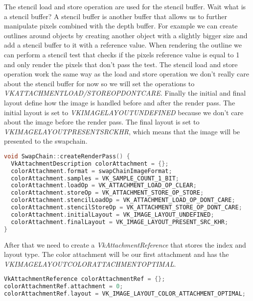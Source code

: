 \documentclass[12pt]{report} \usepackage{preamble}
\begin{document}
The stencil load and store operation are used for the stencil buffer. Wait what is a stencil buffer? A stencil buffer
is another buffer that allows us to further manipulate pixels combined with the depth buffer. For example we can
create outlines around objects by creating another object with a slightly bigger size and add a stencil buffer to it with a
reference value. When rendering the outline we can perform a stencil test that checks if the pixels reference value is
equal to 1 and only render the pixels that don't pass the test. The stencil load and store operation work the same way
as the load and store operation we don't really care about the stencil buffer for now so we will set the operations to
\textit{VK\textunderscore ATTACHMENT\textunderscore LOAD/STORE\textunderscore OP\textunderscore DONT\textunderscore CARE}.
Finally the initial and final layout define how the image is handled before and after the render pass. The initial layout
is set to \textit{VK\textunderscore IMAGE\textunderscore LAYOUT\textunderscore UNDEFINED} because we don't care about the
image before the render pass. The final layout is set to
\textit{VK\textunderscore IMAGE\textunderscore LAYOUT\textunderscore PRESENT\textunderscore SRC\textunderscore KHR},
which means that the image will be presented to the swapchain.

\begin{lstlisting}[language=C++]
void SwapChain::createRenderPass() {
  VkAttachmentDescription colorAttachment = {};
  colorAttachment.format = swapChainImageFormat;
  colorAttachment.samples = VK_SAMPLE_COUNT_1_BIT;
  colorAttachment.loadOp = VK_ATTACHMENT_LOAD_OP_CLEAR;
  colorAttachment.storeOp = VK_ATTACHMENT_STORE_OP_STORE;
  colorAttachment.stencilLoadOp = VK_ATTACHMENT_LOAD_OP_DONT_CARE;
  colorAttachment.stencilStoreOp = VK_ATTACHMENT_STORE_OP_DONT_CARE;
  colorAttachment.initialLayout = VK_IMAGE_LAYOUT_UNDEFINED;
  colorAttachment.finalLayout = VK_IMAGE_LAYOUT_PRESENT_SRC_KHR;
}
\end{lstlisting}

After that we need to create a \textit{VkAttachmentReference} that stores the index and layout type.
The color attachment will be our first attachment and has the \\
\textit{VK\textunderscore IMAGE\textunderscore LAYOUT\textunderscore COLOR\textunderscore ATTACHMENT\textunderscore OPTIMAL}.

\begin{lstlisting}[language=C++]
VkAttachmentReference colorAttachmentRef = {};
colorAttachmentRef.attachment = 0;
colorAttachmentRef.layout = VK_IMAGE_LAYOUT_COLOR_ATTACHMENT_OPTIMAL;
\end{lstlisting}
\end{document}
